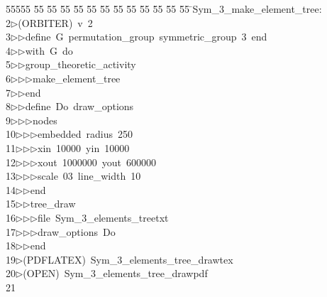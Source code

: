 %
%
\begin{tabbing}
55555 \= 55 \= 55 \= 55 \= 55 \= 55 \= 55 \= 55 \= 55 \= 55 \= 55 \= 55 \= 55 \= \>Sym\_3\_make\_element\_tree:\\[0pt]
2\>$\triangleright$\>(ORBITER)\ v\ 2\ \\[0pt]
3\>$\triangleright$\>$\triangleright$\>define\ G\ permutation\_group\ symmetric\_group\ 3\ end\ \\[0pt]
4\>$\triangleright$\>$\triangleright$\>with\ G\ do\ \\[0pt]
5\>$\triangleright$\>$\triangleright$\>group\_theoretic\_activity\ \\[0pt]
6\>$\triangleright$\>$\triangleright$\>$\triangleright$\>make\_element\_tree\ \\[0pt]
7\>$\triangleright$\>$\triangleright$\>end\\[0pt]
8\>$\triangleright$\>$\triangleright$\>define\ Do\ draw\_options\ \\[0pt]
9\>$\triangleright$\>$\triangleright$\>$\triangleright$\>nodes\ \\[0pt]
10\>$\triangleright$\>$\triangleright$\>$\triangleright$\>embedded\ radius\ 250\ \\[0pt]
11\>$\triangleright$\>$\triangleright$\>$\triangleright$\>xin\ 10000\ yin\ 10000\ \\[0pt]
12\>$\triangleright$\>$\triangleright$\>$\triangleright$\>xout\ 1000000\ yout\ 600000\ \\[0pt]
13\>$\triangleright$\>$\triangleright$\>$\triangleright$\>scale\ 03\ line\_width\ 10\ \\[0pt]
14\>$\triangleright$\>$\triangleright$\>end\ \\[0pt]
15\>$\triangleright$\>$\triangleright$\>tree\_draw\ \\[0pt]
16\>$\triangleright$\>$\triangleright$\>$\triangleright$\>file\ Sym\_3\_elements\_treetxt\ \\[0pt]
17\>$\triangleright$\>$\triangleright$\>$\triangleright$\>draw\_options\ Do\ \\[0pt]
18\>$\triangleright$\>$\triangleright$\>end\\[0pt]
19\>$\triangleright$\>(PDFLATEX)\ Sym\_3\_elements\_tree\_drawtex\\[0pt]
20\>$\triangleright$\>(OPEN)\ Sym\_3\_elements\_tree\_drawpdf\\[0pt]
21\>\end{tabbing}
